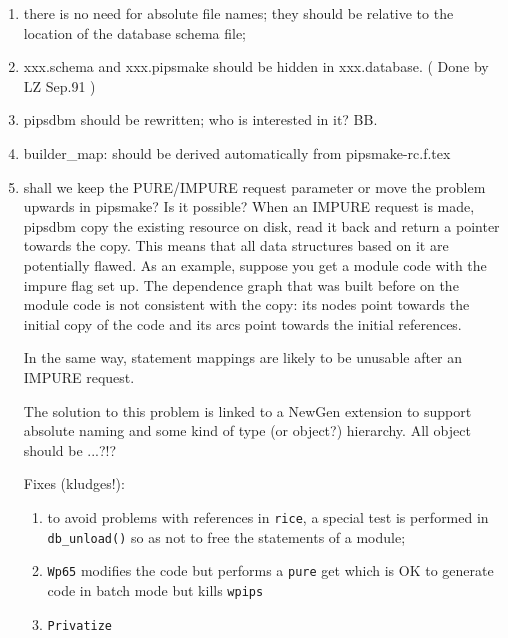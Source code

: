 \begin{enumerate}

  \item there is no need for absolute file names; they should be relative
        to the location of the database schema file;

  \item xxx.schema and xxx.pipsmake should be hidden in xxx.database.
        ( Done by LZ Sep.91 )
        
  \item pipsdbm should be rewritten; who is interested in it? BB.

  \item builder\_map: should be derived automatically from pipsmake-rc.f.tex

  \item shall we keep the PURE/IMPURE request parameter or move the problem
        upwards in pipsmake? Is it possible? When an IMPURE request is made,
        pipsdbm copy the existing resource on disk, read it back and
        return a pointer towards the copy. This means that all data structures
        based on it are potentially flawed. As an example, suppose you
        get a module code with the impure flag set up. The dependence
        graph that was built before on the module code is not consistent
        with the copy: its nodes point towards the initial copy of the
        code and its arcs point towards the initial references.

        In the same way, statement mappings are likely to be unusable
        after an IMPURE request.

        The solution to this problem is linked to a NewGen extension to
        support absolute naming and some kind of type (or object?) hierarchy.
        All object should be ...?!?

        Fixes (kludges!):

  \begin{enumerate}

    \item to avoid problems with references in \verb+rice+, a special
        test
        is performed in \verb+db_unload()+ so as not to free the
        statements
        of a module;

    \item \verb+Wp65+ modifies the code but performs a \verb+pure+
        get which is OK to generate code in batch mode but kills
        \verb+wpips+

    \item \verb+Privatize+


\end{enumerate}
\end{enumerate}
